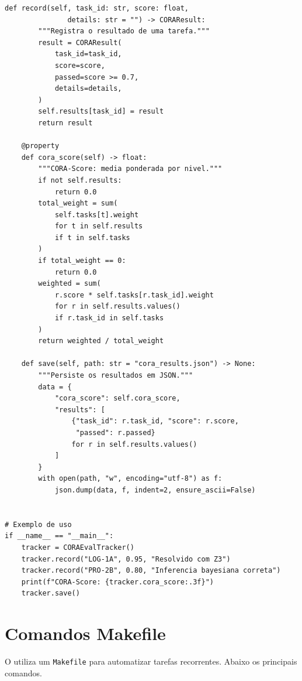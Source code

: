 \begin{lstlisting}[caption={CORA-Eval benchmark tracker},
                   label={cod:cora}, style=pythonstyle]
    def record(self, task_id: str, score: float,
               details: str = "") -> CORAResult:
        """Registra o resultado de uma tarefa."""
        result = CORAResult(
            task_id=task_id,
            score=score,
            passed=score >= 0.7,
            details=details,
        )
        self.results[task_id] = result
        return result

    @property
    def cora_score(self) -> float:
        """CORA-Score: media ponderada por nivel."""
        if not self.results:
            return 0.0
        total_weight = sum(
            self.tasks[t].weight
            for t in self.results
            if t in self.tasks
        )
        if total_weight == 0:
            return 0.0
        weighted = sum(
            r.score * self.tasks[r.task_id].weight
            for r in self.results.values()
            if r.task_id in self.tasks
        )
        return weighted / total_weight

    def save(self, path: str = "cora_results.json") -> None:
        """Persiste os resultados em JSON."""
        data = {
            "cora_score": self.cora_score,
            "results": [
                {"task_id": r.task_id, "score": r.score,
                 "passed": r.passed}
                for r in self.results.values()
            ]
        }
        with open(path, "w", encoding="utf-8") as f:
            json.dump(data, f, indent=2, ensure_ascii=False)


# Exemplo de uso
if __name__ == "__main__":
    tracker = CORAEvalTracker()
    tracker.record("LOG-1A", 0.95, "Resolvido com Z3")
    tracker.record("PRO-2B", 0.80, "Inferencia bayesiana correta")
    print(f"CORA-Score: {tracker.cora_score:.3f}")
    tracker.save()
\end{lstlisting}

\section{Comandos Makefile}
\label{sec:cod-makefile}

O \opencodeeco{} utiliza um \texttt{Makefile} para automatizar tarefas
recorrentes. Abaixo os principais comandos.

